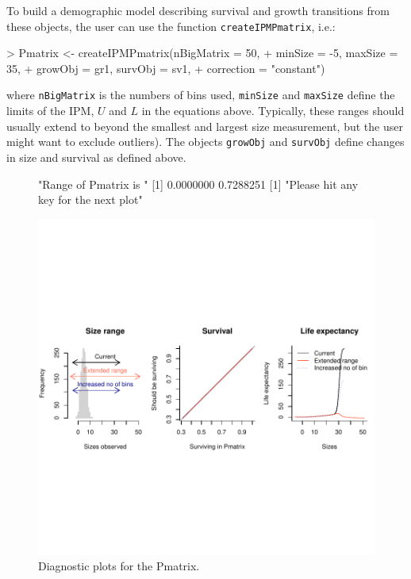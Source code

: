 \documentclass{article}
\begin{document}
To build a demographic model describing survival and growth transitions from these objects, the user can use the function {\tt createIPMPmatrix}, i.e.: 
\begin{Schunk}
\begin{Sinput}
> Pmatrix <- createIPMPmatrix(nBigMatrix = 50, 
+                             minSize = -5, maxSize = 35, 
+                             growObj = gr1, survObj = sv1, 
+                             correction = "constant")
\end{Sinput}
\end{Schunk}
where {\tt nBigMatrix} is the numbers of bins used, {\tt minSize} and
{\tt maxSize} define the limits of the IPM, $U$ and $L$ in the
equations above. Typically, these ranges should usually extend to beyond the
smallest and largest size measurement, but the user might want to exclude
outliers). The objects {\tt growObj} and {\tt survObj} define changes in size
and survival as defined above. 

\begin{figure}
\begin{center}
\begin{Schunk}
\begin{Soutput}
[1] "Range of Pmatrix is "
[1] 0.0000000 0.7288251
[1] "Please hit any key for the next plot"
\end{Soutput}
\end{Schunk}
\includegraphics{IPMpack_Vignette-fig:triDiag}
\end{center}
\caption{Diagnostic plots for the Pmatrix.}
\label{fig:triDiag}
\end{figure}
\end{document}
